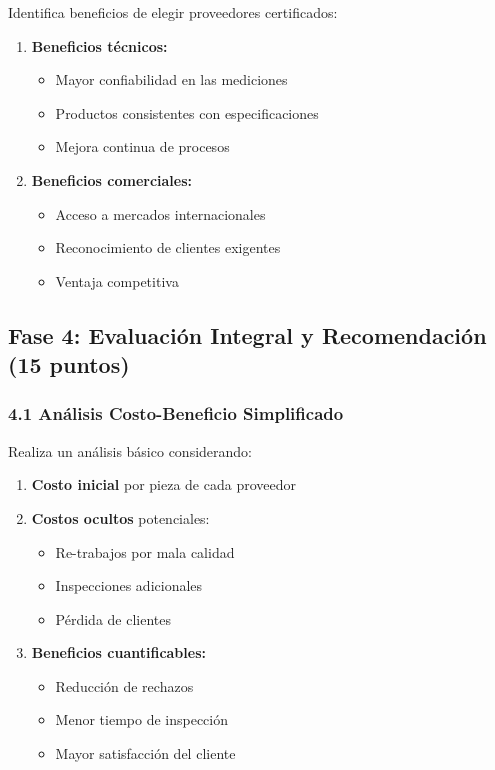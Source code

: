 \documentclass{article}
\begin{document}
Identifica beneficios de elegir proveedores certificados:
\begin{enumerate}
    \item \textbf{Beneficios técnicos:}
    \begin{itemize}
        \item Mayor confiabilidad en las mediciones
        \item Productos consistentes con especificaciones
        \item Mejora continua de procesos
    \end{itemize}
    \item \textbf{Beneficios comerciales:}
    \begin{itemize}
        \item Acceso a mercados internacionales
        \item Reconocimiento de clientes exigentes
        \item Ventaja competitiva
    \end{itemize}
\end{enumerate}

\subsection*{Fase 4: Evaluación Integral y Recomendación (15 puntos)}

\subsubsection*{4.1 Análisis Costo-Beneficio Simplificado}

Realiza un análisis básico considerando:
\begin{enumerate}
    \item \textbf{Costo inicial} por pieza de cada proveedor
    \item \textbf{Costos ocultos} potenciales:
    \begin{itemize}
        \item Re-trabajos por mala calidad
        \item Inspecciones adicionales
        \item Pérdida de clientes
    \end{itemize}
    \item \textbf{Beneficios cuantificables:}
    \begin{itemize}
        \item Reducción de rechazos
        \item Menor tiempo de inspección
        \item Mayor satisfacción del cliente
    \end{itemize}
\end{enumerate}
\end{document}
